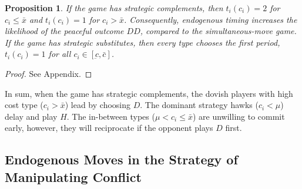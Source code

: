 \documentclass[12pt,english]{article}
\begin{document}
\newtheorem{prop}{Proposition}
\begin{prop}
If the game has strategic complements, then $t_{i}(c_i)=2$ for $c_{i} \leq \bar{x}$ and $t_{i}(c_i)=1$ for $c_i >\bar{x}$. Consequently, endogenous timing increases the likelihood of the peaceful outcome $DD$, compared to the simultaneous-move game. If the game has strategic substitutes, then every type chooses the first period, $t_{i}(c_{i})=1$ for all $c_{i}\in[\underbar{c},\bar{c}]$.
\end{prop}\par
\begin{proof}
See Appendix.
\end{proof}
In sum, when the game has strategic complements, the dovish players with high cost type ($c_i>\bar{x}$) lead by choosing $D$. The dominant strategy hawks ($c_i<\mu $) delay and play $H$. The in-between types ($\mu<c_i\leq \bar{x}$) are unwilling to commit early, however, they will reciprocate if the opponent plays $D$ first. %

\iffalse
\subsection{Endogenous Moves in the Strategy of Manipulating Conflict}
\end{document}
